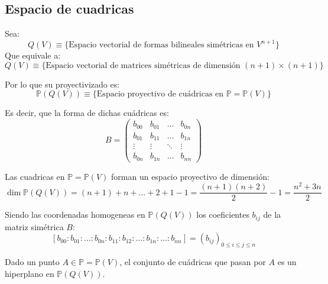 \subsection{Espacio de cuadricas}

Sea:
\[
Q(V) \equiv \{ \text{Espacio vectorial de formas bilineales simétricas en } V^{n+1} \}
\]
Que equivale a:
\[
Q(V) \equiv \{ \text{Espacio vectorial de matrices simétricas de dimensión } (n+1) \times (n+1) \}
\]

Por lo que su proyectivizado es:
\[
\mathbb{P} (Q(V)) \equiv \{ \text{Espacio proyectivo de cuádricas en } \mathbb{P} = \mathbb{P}(V) \}
\]

Es decir, que la forma de dichas cuádricas es:
\[
B =
\begin{pmatrix}
    b_{00} & b_{01} & \ldots & b_{0n} \\
    b_{01} & b_{11} & \ldots & b_{1n} \\
    \vdots & \vdots & \ddots & \vdots \\
    b_{0n} & b_{1n} & \ldots & b_{nn}
\end{pmatrix}
\]

Las cuadricas en $\mathbb{P} = \mathbb{P}(V)$ forman un espacio proyectivo de dimensión:
\[
\dim \mathbb{P} (Q(V)) = (n+1) + n + \ldots + 2 + 1 - 1 = \frac{(n+1)(n+2)}{2} - 1 = \frac{n^2 + 3n}{2}
\]

Siendo las coordenadas homogeneas en $\mathbb{P} (Q(V))$ los coeficientes $b_{ij}$ de la matriz simétrica $B$:
\[
[b_{00} : b_{01} : \ldots : b_{0n} : b_{11} : b_{12} : \ldots : b_{1n} : \ldots : b_{nn}] =
\left( b_{ij} \right)_{0 \leq i \leq j \leq n}
\]


\begin{lema}
    Dado un punto $A \in \mathbb{P} = \mathbb{P}(V)$, el conjunto de cuádricas que pasan por $A$ es un hiperplano en $\mathbb{P}(Q(V))$.
\end{lema}

